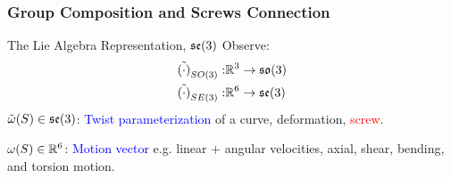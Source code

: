 \begin{frame}
	\frametitle{Group Composition and Screws Connection}	
	\begin{block}{The Lie Algebra Representation, $\mathfrak{se}(3)$}
		Observe:  
		\begin{align}
			\tilde{(\cdot)}_{SO(3)}: &\mathbb{R}^3 \rightarrow \mathfrak{so}(3) \\
			\tilde{(\cdot)}_{SE(3)}: &\mathbb{R}^6 \rightarrow \mathfrak{se}(3) 
		\end{align}
		$\tilde{\omega}(S)\in \mathfrak{se}(3)$: \textcolor{blue}{Twist parameterization} of a curve, deformation, \textcolor{red}{screw}.
		
		${\omega}(S)\in \mathbb{R}^6$: \textcolor{blue}{Motion vector} e.g. linear + angular velocities, axial, shear, bending, and torsion motion.
	\end{block}
\end{frame}